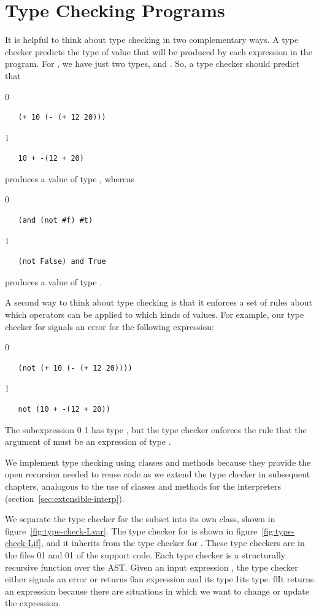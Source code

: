 \documentclass[7x10]{TimesAPriori_MIT}%
\def\racketEd{0}
\def\pythonEd{1}
\providecommand{\BookEdition}{1}
\let\edition\BookEdition
\newcommand{\racket}[1]{{\if\edition\racketEd{#1}\fi}}
\newcommand{\pythonColor}[0]{}
\newcommand{\python}[1]{{\if\edition\pythonEd\pythonColor #1\fi}}
\numberwithin{theorem}{chapter}
\numberwithin{definition}{chapter}
\numberwithin{equation}{chapter}
\begin{document}
\section{Type Checking \LangIf{} Programs}
\label{sec:type-check-Lif}

It is helpful to think about type checking in two complementary ways. A type checker predicts the
type of value that will be produced by each expression in the program.
For \LangIf{}, we have just two types, \INTTY{} and \BOOLTY{}. So, a
type checker should predict that {\if\edition\racketEd
\begin{lstlisting}
   (+ 10 (- (+ 12 20)))
\end{lstlisting}
\fi}
{\if\edition\pythonEd\pythonColor
\begin{lstlisting}
   10 + -(12 + 20)
\end{lstlisting}
\fi}
\noindent produces a value of type \INTTY{}, whereas
{\if\edition\racketEd
\begin{lstlisting}
   (and (not #f) #t)
\end{lstlisting}
\fi}
{\if\edition\pythonEd\pythonColor
\begin{lstlisting}
   (not False) and True
\end{lstlisting}
\fi}
\noindent produces a value of type \BOOLTY{}.

A second way to think about type checking is that it enforces a set of
rules about which operators can be applied to which kinds of
values. For example, our type checker for \LangIf{} signals an error
for the following expression:
%
{\if\edition\racketEd
\begin{lstlisting}
   (not (+ 10 (- (+ 12 20))))
\end{lstlisting}
\fi}
{\if\edition\pythonEd\pythonColor
\begin{lstlisting}
   not (10 + -(12 + 20))
\end{lstlisting}
\fi}
\noindent The subexpression
\racket{}
\python{}
has type \INTTY{}, but the type checker enforces the rule that the
argument of  must be an expression of type \BOOLTY{}.

We implement type checking using classes and methods because they
provide the open recursion needed to reuse code as we extend the type
checker in subsequent chapters, analogous to the use of classes and methods
for the interpreters (section~\ref{sec:extensible-interp}).

We separate the type checker for the \LangVar{} subset into its own
class, shown in figure~\ref{fig:type-check-Lvar}. The type checker for
\LangIf{} is shown in figure~\ref{fig:type-check-Lif}, and it inherits
from the type checker for \LangVar{}. These type checkers are in the
files
\racket{}\python{}
and
\racket{}\python{}
of the support code.
%
Each type checker is a structurally recursive function over the AST.
Given an input expression , the type checker either signals an
error or returns \racket{an expression and its type.}\python{its type.}
%
\racket{It returns an expression because there are situations in which
  we want to change or update the expression.}
\end{document}

